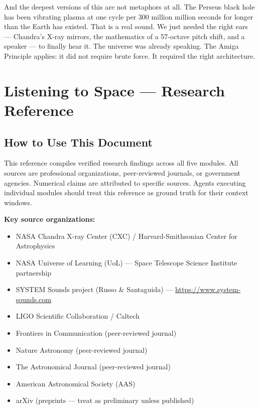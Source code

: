 \documentclass[11pt,letterpaper]{article}
\newcommand{\stageheader}[2]{%
  \noindent\colorbox{#2}{\makebox[\textwidth][l]{%
    \textcolor{white}{\bfseries\sffamily\hspace{6pt}#1\hspace{6pt}}}}%
  \vspace{0.5em}\par%
}
\begin{document}
And the deepest versions of this are not metaphors at all. The Perseus black hole has been vibrating plasma at one cycle per 300 million million seconds for longer than the Earth has existed. That is a real sound. We just needed the right ears — Chandra's X-ray mirrors, the mathematics of a 57-octave pitch shift, and a speaker — to finally hear it. The universe was already speaking. The Amiga Principle applies: it did not require brute force. It required the right architecture.

\newpage
\stageheader{STAGE 2 --- RESEARCH REFERENCE}{secondary}

\section{Listening to Space — Research Reference}

\subsection{How to Use This Document}

This reference compiles verified research findings across all five modules. All sources are professional organizations, peer-reviewed journals, or government agencies. Numerical claims are attributed to specific sources. Agents executing individual modules should treat this reference as ground truth for their context windows.

\textbf{Key source organizations:}
\begin{itemize}
  \item NASA Chandra X-ray Center (CXC) / Harvard-Smithsonian Center for Astrophysics
  \item NASA Universe of Learning (UoL) — Space Telescope Science Institute partnership
  \item SYSTEM Sounds project (Russo \& Santaguida) — \url{https://www.system-sounds.com}
  \item LIGO Scientific Collaboration / Caltech
  \item Frontiers in Communication (peer-reviewed journal)
  \item Nature Astronomy (peer-reviewed journal)
  \item The Astronomical Journal (peer-reviewed journal)
  \item American Astronomical Society (AAS)
  \item arXiv (preprints — treat as preliminary unless published)
\end{itemize}
\end{document}
